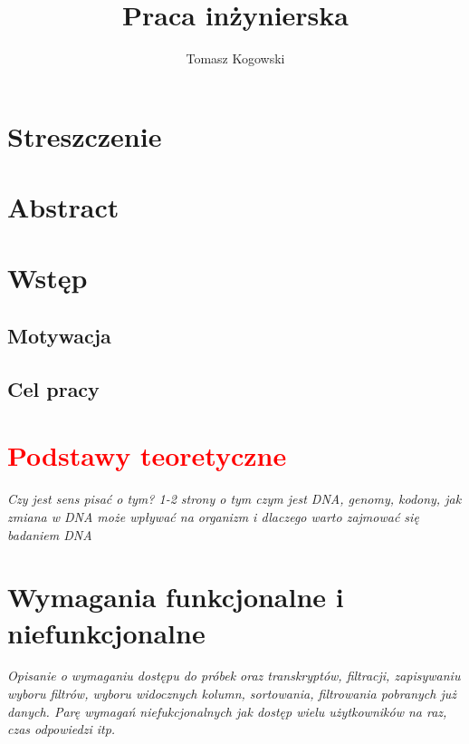 \documentclass[a4paper,12pt,twoside]{article}
\title{Praca inżynierska}
\author{Tomasz Kogowski}
\begin{document}

\newpage 
\section*{Streszczenie}
\newpage 
\section*{Abstract}

\newpage

\newpage
\tableofcontents
 
\newpage
\section{Wstęp}  





\subsection{Motywacja}  

\subsection{Cel pracy} 
\newpage
\section{\textcolor{red}{Podstawy teoretyczne}}  

\textit{Czy jest sens pisać o tym? 
1-2 strony o tym czym jest DNA, genomy, kodony, jak zmiana w DNA może wpływać na organizm i dlaczego warto zajmować się badaniem DNA}
\newpage
\section{Wymagania funkcjonalne i niefunkcjonalne}  
\textit{
Opisanie o wymaganiu dostępu do próbek oraz transkryptów, 
filtracji, zapisywaniu wyboru filtrów,
wyboru widocznych kolumn, sortowania, filtrowania pobranych już danych.\newline
Parę wymagań niefukcjonalnych jak dostęp wielu użytkowników na raz, czas odpowiedzi itp.}
\newpage
\end{document}
